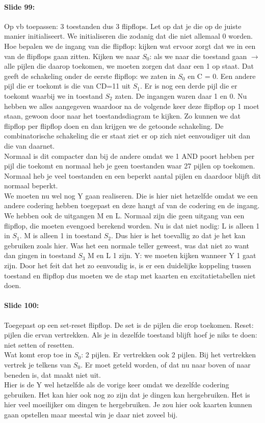 \documentclass[10pt,a4paper]{book}
\begin{document}
\paragraph{Slide 99:} Op vb toepassen: 3 toestanden dus 3 flipflops. Let op dat je die op de juiste manier initialiseert. We initialiseren die zodanig dat die niet allemaal 0 worden. Hoe bepalen we de ingang van die flipflop: kijken wat ervoor zorgt dat we in een van de flipflops gaan zitten. Kijken we naar $S_0$: als we naar die toestand gaan $\rightarrow$ alle pijlen die daarop toekomen, we moeten zorgen dat daar een 1 op staat. Dat geeft de schakeling onder de eerste flipflop: we zaten in $S_0$ en C = 0. Een andere pijl die er toekomt is die van CD=11 uit $S_1$. Er is nog een derde pijl die er toekomt waarbij we in toestand $S_2$ zaten. De ingangen waren daar 1 en 0. Nu hebben we alles aangegeven waardoor na de volgende keer deze flipflop op 1 moet staan, gewoon door naar het toestandsdiagram te kijken. Zo kunnen we dat flipflop per flipflop doen en dan krijgen we de getoonde schakeling. De combinatorische schakeling die er staat ziet er op zich niet eenvoudiger uit dan die van daarnet.\\
Normaal is dit compacter dan bij de andere omdat we 1 AND poort hebben per pijl die toekomt en normaal heb je geen toestanden waar 27 pijlen op toekomen. Normaal heb je veel toestanden en een beperkt aantal pijlen en daardoor blijft dit normaal beperkt.\\
We moeten nu wel nog Y gaan realiseren. Die is hier niet hetzelfde omdat we een andere codering hebben toegepast en deze hangt af van de codering en de ingang. We hebben ook de uitgangen M en L. Normaal zijn die geen uitgang van een flipflop, die moeten evengoed berekend worden. Nu is dat niet nodig: L is alleen 1 in $S_1$. M is alleen 1 in toestand $S_2$. Dus hier is het toevallig zo dat je het kan gebruiken zoals hier. Was het een normale teller geweest, was dat niet zo want dan gingen in toestand $S_3$ M en L 1 zijn. Y: we moeten kijken wanneer Y 1 gaat zijn. Door het feit dat het zo eenvoudig is, is er een duidelijke koppeling tussen toestand en flipflop dus moeten we de stap met kaarten en excitatietabellen niet doen.

\paragraph{Slide 100:} Toegepast op een set-reset flipflop. De set is de pijlen die erop toekomen. Reset: pijlen die ervan vertrekken. Als je in dezelfde toestand blijft hoef je niks te doen: niet setten of resetten.\\
Wat komt erop toe in $S_0$: 2 pijlen. Er vertrekken ook 2 pijlen. Bij het vertrekken vertrek je telkens van $S_0$. Er moet geteld worden, of dat nu naar boven of naar beneden is, dat maakt niet uit.\\
Hier is de Y wel hetzelfde als de vorige keer omdat we dezelfde codering gebruiken. Het kan hier ook nog zo zijn dat je dingen kan hergebruiken. Het is hier veel moeilijker om dingen te hergebruiken. Je zou hier ook kaarten kunnen gaan opstellen maar meestal win je daar niet zoveel bij.
\end{document}
